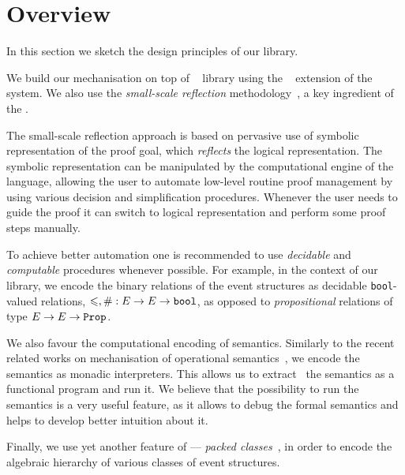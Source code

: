 \section{Overview}

In this section we sketch the design principles of our library. 

We build our mechanisation on top of \mathcomp~\cite{Mahboubi-Tassi:MATHCOMP17} library 
using the \ssreflect~\cite{Gonthier-al:SSR2016} extension of the \coq system.
We also use the \emph{small-scale reflection} 
methodology~\cite{Gonthier-Assia:SSR2010, Gonthier-al:SSR2016}, 
a key ingredient of the \ssreflect. 

The small-scale reflection approach is based on 
pervasive use of symbolic representation of the proof goal, 
which \emph{reflects} the logical representation. 
The symbolic representation can be manipulated 
by the computational engine of the language, 
allowing the user to automate low-level routine 
proof management by using various decision 
and simplification procedures. 
Whenever the user needs to guide the proof 
it can switch to logical representation
and perform some proof steps manually. 

To achieve better automation one is recommended 
to use \emph{decidable} and \emph{computable} procedures
whenever possible.
For example, in the context of our library, 
we encode the binary relations of the event structures
as decidable \texttt{bool}-valued relations, 
\ie $\leqslant, \# : E \rightarrow E \rightarrow \texttt{bool}$,
as opposed to \emph{propositional} 
relations of type $E \rightarrow E \rightarrow \texttt{Prop}$. 

We also favour the computational encoding of semantics. 
Similarly to the recent related works on mechanisation 
of operational semantics~\cite{Xia-al:POPL2019, Letan-al:CPP2020, Affeldt-al:ICMPC2019}, 
we encode the semantics as monadic interpreters.  
This allows us to extract~\cite{Letouzey:CCE2008} 
the semantics as a functional program and run it. 
We believe that the possibility to run the semantics 
is a very useful feature, as it allows 
to debug the formal semantics
and helps to develop better intuition about it.

Finally, we use yet another feature of \mathcomp --- 
\emph{packed classes}~\cite{Garillot-al:ICTPHOL2009}, 
in order to encode the algebraic hierarchy
of various classes of event structures. 